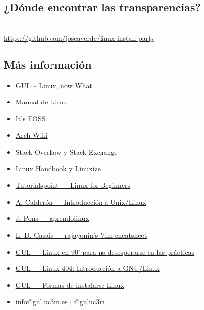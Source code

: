 \documentclass[aspectratio=43]{beamer}
\begin{document}
    \subsection{¿Dónde encontrar las transparencias?}
    \begin{frame}[plain]{\subsecname}
        \centering{}
        \hphantom{}\\
        \url{https://github.com/joseaverde/linux-install-party}
    \end{frame}
    \subsection{Más información}
    \begin{frame}{\secname}{\subsecname}
        \begin{itemize}
            \item \href{https://github.com/rajayonin/linux-now-what}{GUL -- Linux, now What}
            \item \href{https://github.com/gmorales08/ManualLinux/blob/master/MANUAL_LINUX}{Manual de Linux}
            \item \href{https://itsfoss.com/}{It's FOSS}
            \item \href{https://wiki.archlinux.org/}{Arch Wiki}
            \item \href{https://stackoverflow.com/}{Stack Overflow} y \href{https://stackoverflow.com/}{Stack Exchange}
            \item \href{https://stackoverflow.com/}{Linux Handbook} y \href{https://linuxize.com/}{Linuxize}
            \item \href{https://www.tutorialspoint.com/unix/index.htm}{Tutorialspoint — Linux for Beginners}
            \item \href{https://github.com/acaldero/uc3m_linux}{A. Calderón — Introducción a Unix/Linux}
            \item \href{https://aprendolinux.com}{J. Pons — aprendolinux}
            \item \href{https://github.com/rajayonin/cheatsheets/blob/main/vim_cheatsheet.md}{L. D. Casais — rajayonin's Vim cheatsheet}
            \item \href{https://youtu.be/2qZBUa93MQ8}{GUL — Linux en 90' para no desesperarse en las prácticas}
            \item \href{https://cloud-gul.uc3m.es/s/4qXKozr7DmDSZiN}{GUL — Linux 404: Introducción a GNU/Linux}
            \item \href{https://github.com/guluc3m/linux404/blob/main/README.md}{GUL — Formas de instalarse Linux}
            \item \href{mailto:info@gul.uc3m.es}{info@gul.uc3m.es} | \href{https://twitter.com/guluc3m}{@guluc3m}
        \end{itemize}
    \end{frame}
\end{document}
